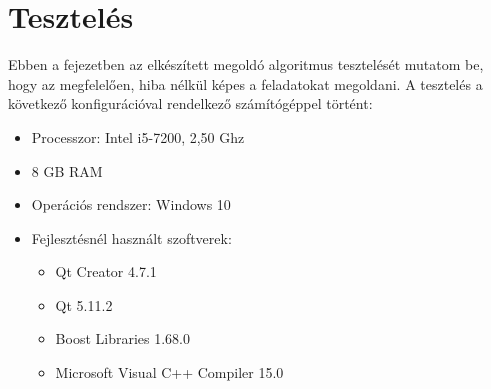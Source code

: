 \chapter{Tesztelés}
Ebben a fejezetben az elkészített megoldó algoritmus tesztelését mutatom be, hogy az megfelelően, hiba nélkül képes a feladatokat megoldani.
A tesztelés a következő konfigurációval rendelkező számítógéppel történt:
\begin{itemize}
	\item Processzor: Intel i5-7200, 2,50 Ghz
	\item 8 GB RAM
	\item Operációs rendszer: Windows 10
	\item Fejlesztésnél használt szoftverek:
		\begin{itemize}
			\item Qt Creator 4.7.1
			\item Qt 5.11.2
			\item Boost Libraries 1.68.0
			\item Microsoft Visual C++ Compiler 15.0 
		\end{itemize}		 
\end{itemize}

